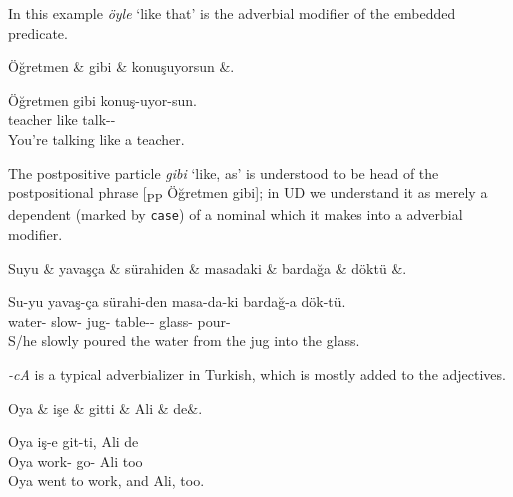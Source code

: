 \documentclass[11pt,a4paper]{article}
\begin{document}
In this example \textit{öyle} ‘like that’ is the adverbial modifier of the embedded predicate.

\begin{exe}
\ex \label{advmod}
\begin{dependency}
\begin{deptext}[column sep=0.22cm]
Öğretmen \& gibi \& konuşuyorsun \&. \\
\end{deptext}
\end{dependency}
\gll Öğretmen gibi konuş-uyor-sun. \\
teacher like talk-\Prog{}-\Ssg{} \\
\glt You’re talking like a teacher.
\end{exe}

The postpositive particle \textit{gibi} ‘like, as’ is understood to be head of the postpositional phrase [\textsubscript{PP} Öğretmen gibi]; in UD we understand it as merely a dependent (marked by \texttt{case}) of a nominal which it makes into a adverbial modifier.

\begin{exe}
\ex \label{advmod}
\begin{dependency}
\begin{deptext}[column sep=0.32cm]
Suyu \& yavaşça \& sürahiden \& masadaki \& bardağa \& döktü \&. \\
\end{deptext}
\end{dependency}
\gll Su-yu yavaş-ça sürahi-den masa-da-ki bardağ-a dök-tü.  \\
water-\Acc{} slow-\Adv{} jug-\Abl{} table-\Loc{}-\Adj{} glass-\Dat{} pour-\Pst{} \\
\glt S/he slowly poured the water from the jug into the glass.
\end{exe}

\textit{-cA} is a typical adverbializer in Turkish, which is mostly added to the adjectives.

\begin{exe}
\ex \label{advmod:emph}
\begin{dependency}
\begin{deptext}[column sep=0.24cm]
Oya \& işe \& gitti \& Ali \& de\&. \\
\end{deptext}
\end{dependency}
\gll Oya iş-e git-ti, Ali de  \\
Oya work-\Dat{} go-\Pst{} Ali too  \\
\glt Oya went to work, and Ali, too.
\end{exe}
\end{document}
